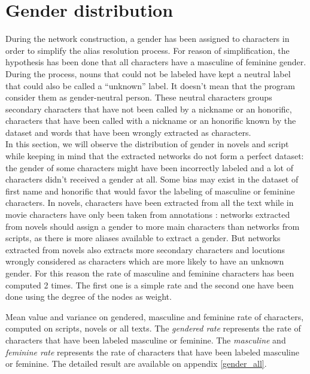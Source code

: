 \documentclass[a4paper, 12pt]{report}
\begin{document}
\section{Gender distribution}
During the network construction, a gender has been assigned to characters in order to simplify the alias resolution process. For reason of simplification, the hypothesis has been done that all characters have a masculine of feminine gender. During the process, nouns that could not be labeled have kept a neutral label that could also be called a ``unknown'' label. It doesn't mean that the program consider them as gender-neutral person. These neutral characters groups secondary characters that have not been called by a nickname or an honorific, characters that have been called with a nickname or an honorific  known by the dataset and words that have been wrongly extracted as characters.\\

In this section, we will observe the distribution of gender in novels and script while keeping in mind that the extracted networks do not form a perfect dataset: the gender of some characters might have been incorrectly labeled and a lot of characters didn't received a gender at all. Some bias may exist in the dataset of first name and honorific that would favor the labeling of masculine or feminine characters. In novels, characters have been extracted from all the text while in movie characters have only been taken from annotations : networks extracted from novels should assign a gender to more main characters than networks from scripts, as there is more aliases available to extract a gender. But networks extracted from novels also extracts more secondary characters and locutions wrongly considered as characters which are more likely to have an unknown gender. For this reason the rate of masculine and feminine characters has been computed 2 times. The first one is a simple rate and the second one have been done using the degree of the nodes as weight.\\

\begin{table}[]
\caption{Mean value and variance on gendered, masculine and feminine rate of characters, computed on scripts, novels or all texts. The \textit{gendered rate} represents the  rate of characters that have been labeled masculine or feminine. The \textit{masculine} and \textit{feminine rate} represents the rate of characters that have been labeled masculine or feminine. The detailed result are available on appendix \ref{gender_all}.}
 \label{gender_short}
\end{table}
\end{document}
